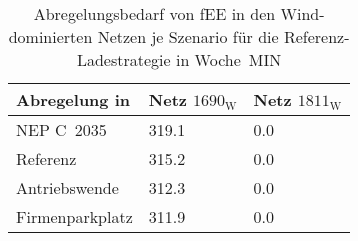 {
\renewcommand{\arraystretch}{1.2}%
\begin{table}[H]
	\begin{center}
		\caption{Abregelungsbedarf von fEE in den Wind-dominierten Netzen je Szenario für die Referenz-Ladestrategie in Woche~MIN}
		\begin{tabu} to 0.6\textwidth {X[1.5] X[1, r] X[1, r]}
			\toprule
			Abregelung in   \si{\mwh}    & Netz \(1690_{\text{W}}\) & Netz \(1811_{\text{W}}\) \\ \midrule
			NEP C~\num{2035}             & \num{319.1}     & \num{0.0}       \\
			Referenz                     & \num{315.2}     & \num{0.0}       \\
			Antriebswende                & \num{312.3}     & \num{0.0}       \\
			\glqq Firmenparkplatz\grqq{} & \num{311.9}     & \num{0.0}       \\ \bottomrule
		\end{tabu}
		\label{tab:wind_dominated_week_a_fee_cur}
	\end{center}
	\vspace{-3mm}%
\end{table}
}